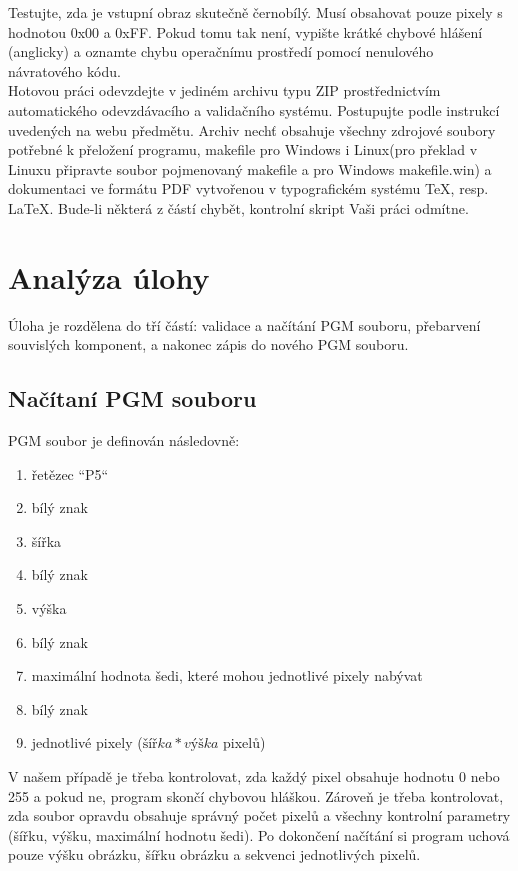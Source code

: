 Testujte, zda je vstupní obraz skutečně černobílý. Musí obsahovat pouze pixely
s hodnotou 0x00 a 0xFF\@. Pokud tomu tak není, vypište krátké chybové hlášení
(anglicky) a oznamte chybu operačnímu prostředí pomocí nenulového návratového
kódu.
\\

Hotovou práci odevzdejte v jediném archivu typu ZIP prostřednictvím
automatického odevzdávacího a validačního systému. Postupujte podle instrukcí
uvedených na webu předmětu. Archiv nechť obsahuje všechny zdrojové soubory
potřebné k přeložení programu, makefile pro Windows i Linux(pro překlad v
Linuxu připravte soubor pojmenovaný makefile a pro Windows makefile.win) a
dokumentaci ve formátu PDF vytvořenou v typografickém systému \TeX{}, resp.
\LaTeX{}. Bude-li některá z částí chybět, kontrolní skript Vaši práci odmítne.

\chapter{Analýza úlohy}
Úloha je rozdělena do tří částí: validace a načítání PGM souboru, přebarvení
souvislých komponent, a nakonec zápis do nového PGM souboru.
\section{Načítaní PGM souboru}
PGM soubor je definován následovně:
\begin{enumerate}
	\item řetězec ``P5``
	\item bílý znak
	\item šířka
	\item bílý znak
	\item výška
	\item bílý znak
	\item maximální hodnota šedi, které mohou jednotlivé pixely nabývat
	\item bílý znak
	\item jednotlivé pixely ($šířka * výška$ pixelů)
\end{enumerate}

V našem případě je třeba kontrolovat, zda každý pixel obsahuje hodnotu 0 nebo
255 a pokud ne, program skončí chybovou hláškou. Zároveň je třeba kontrolovat,
zda soubor opravdu obsahuje správný počet pixelů a všechny kontrolní parametry
(šířku, výšku, maximální hodnotu šedi). Po dokončení načítání si program uchová
pouze výšku obrázku, šířku obrázku a sekvenci jednotlivých pixelů.


